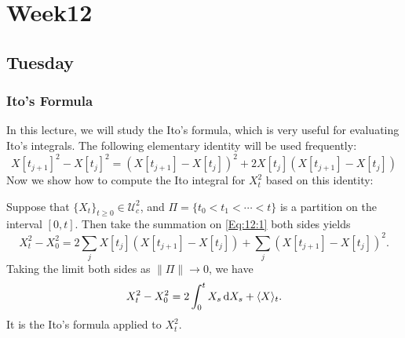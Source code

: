 
\chapter{Week12}

\section{Tuesday}
\subsection{Ito's Formula}
In this lecture, we will study the Ito's formula, which is very useful for evaluating Ito's integrals.
The following elementary identity will be used frequently:
\begin{equation}\label{Eq:12:1}
X[t_{j+1}]^2 - X[t_{j}]^2 = (X[t_{j+1}] - X[t_{j}])^2 + 2X[t_{j}](X[t_{j+1}] - X[t_{j}])
\end{equation}
Now we show how to compute the Ito integral for $X_t^2$ based on this identity:
\begin{example}
Suppose that $\{X_t\}_{t\ge0}\in\mathcal{U}_c^2$, and $\Pi=\{t_0<t_1<\cdots<t\}$ is a partition on the interval $[0,t]$. Then take the summation on \eqref{Eq:12:1} both sides yields
\[
X_t^2 - X_0^2 = 2\sum_jX[t_{j}](X[t_{j+1}] - X[t_{j}]) + \sum_j(X[t_{j+1}] - X[t_{j}])^2.
\]
Taking the limit both sides as $\|\Pi\|\to0$, we have
\[
X_t^2-X_0^2 = 2\int_0^tX_s\,\mathrm{d} X_s + \langle X\rangle_t.
\]
It is the Ito's formula applied to $X_t^2$.
\end{example}

